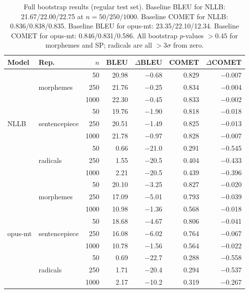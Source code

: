 \documentclass[11pt]{article}
\begin{document}
\begin{table}[t]
\centering
\small
\begin{tabular}{llrrrrr}
\toprule
\textbf{Model} & \textbf{Rep.} & \textbf{$n$} & \textbf{BLEU} & \textbf{$\Delta$BLEU} & \textbf{COMET} & \textbf{$\Delta$COMET} \\
\midrule
\multirow{9}{*}{NLLB}
 & \multirow{3}{*}{morphemes}     &  50  & 20.98 & $-$0.68 & 0.829 & $-$0.007 \\
 &                                & 250  & 21.76 & $-$0.25 & 0.834 & $-$0.004 \\
 &                                & 1000 & 22.30 & $-$0.45 & 0.833 & $-$0.002 \\
\cmidrule{2-7}
 & \multirow{3}{*}{sentencepiece} &  50  & 19.76 & $-$1.90 & 0.818 & $-$0.018 \\
 &                                & 250  & 20.51 & $-$1.49 & 0.825 & $-$0.013 \\
 &                                & 1000 & 21.78 & $-$0.97 & 0.828 & $-$0.007 \\
\cmidrule{2-7}
 & \multirow{3}{*}{radicals}      &  50  &  0.66 & $-$21.0 & 0.291 & $-$0.545 \\
 &                                & 250  &  1.55 & $-$20.5 & 0.404 & $-$0.433 \\
 &                                & 1000 &  2.21 & $-$20.5 & 0.439 & $-$0.396 \\
\midrule
\multirow{9}{*}{opus-mt}
 & \multirow{3}{*}{morphemes}     &  50  & 20.10 & $-$3.25 & 0.827 & $-$0.020 \\
 &                                & 250  & 17.09 & $-$5.01 & 0.793 & $-$0.039 \\
 &                                & 1000 & 10.98 & $-$1.36 & 0.568 & $-$0.018 \\
\cmidrule{2-7}
 & \multirow{3}{*}{sentencepiece} &  50  & 18.68 & $-$4.67 & 0.806 & $-$0.041 \\
 &                                & 250  & 16.08 & $-$6.02 & 0.764 & $-$0.067 \\
 &                                & 1000 & 10.78 & $-$1.56 & 0.564 & $-$0.022 \\
\cmidrule{2-7}
 & \multirow{3}{*}{radicals}      &  50  &  0.69 & $-$22.7 & 0.288 & $-$0.558 \\
 &                                & 250  &  1.71 & $-$20.4 & 0.294 & $-$0.537 \\
 &                                & 1000 &  2.17 & $-$10.2 & 0.319 & $-$0.267 \\
\bottomrule
\end{tabular}
\caption{Full bootstrap results (regular test set). Baseline BLEU for NLLB: 21.67/22.00/22.75 at $n=50/250/1000$. Baseline COMET for NLLB: 0.836/0.838/0.835. Baseline BLEU for opus-mt: 23.35/22.10/12.34. Baseline COMET for opus-mt: 0.846/0.831/0.586. All bootstrap $p$-values $>0.45$ for morphemes and SP; radicals are all $>3\sigma$ from zero.}
\label{tab:full_bootstrap}
\end{table}
\end{document}
